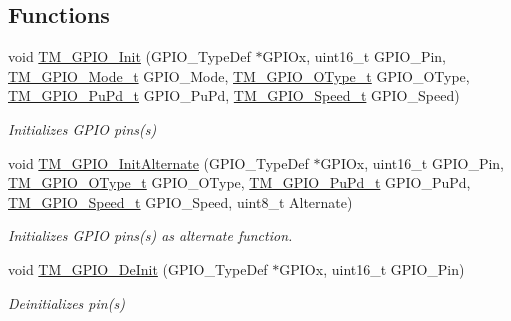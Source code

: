 \subsection*{Functions}
\begin{DoxyCompactItemize}
\item 
void \hyperlink{group___t_m___g_p_i_o___functions_ga7ea61719f45c8d46e56f636d7ffdf0d0}{T\+M\+\_\+\+G\+P\+I\+O\+\_\+\+Init} (G\+P\+I\+O\+\_\+\+Type\+Def $\ast$G\+P\+I\+Ox, uint16\+\_\+t G\+P\+I\+O\+\_\+\+Pin, \hyperlink{group___t_m___g_p_i_o___typedefs_gacbb363a57d0e70ea563e494eff1db3ca}{T\+M\+\_\+\+G\+P\+I\+O\+\_\+\+Mode\+\_\+t} G\+P\+I\+O\+\_\+\+Mode, \hyperlink{group___t_m___g_p_i_o___typedefs_ga1d443fe266a4073f40ea271ae7b8df9f}{T\+M\+\_\+\+G\+P\+I\+O\+\_\+\+O\+Type\+\_\+t} G\+P\+I\+O\+\_\+\+O\+Type, \hyperlink{group___t_m___g_p_i_o___typedefs_ga50ddb0da56d8a388dee368c55e968602}{T\+M\+\_\+\+G\+P\+I\+O\+\_\+\+Pu\+Pd\+\_\+t} G\+P\+I\+O\+\_\+\+Pu\+Pd, \hyperlink{group___t_m___g_p_i_o___typedefs_gaa57736d106efbe14067be22025f296c4}{T\+M\+\_\+\+G\+P\+I\+O\+\_\+\+Speed\+\_\+t} G\+P\+I\+O\+\_\+\+Speed)
\begin{DoxyCompactList}\small\item\em Initializes G\+P\+IO pins(s) \end{DoxyCompactList}\item 
void \hyperlink{group___t_m___g_p_i_o___functions_gac91349d1bf42b50463ebc2716130eb89}{T\+M\+\_\+\+G\+P\+I\+O\+\_\+\+Init\+Alternate} (G\+P\+I\+O\+\_\+\+Type\+Def $\ast$G\+P\+I\+Ox, uint16\+\_\+t G\+P\+I\+O\+\_\+\+Pin, \hyperlink{group___t_m___g_p_i_o___typedefs_ga1d443fe266a4073f40ea271ae7b8df9f}{T\+M\+\_\+\+G\+P\+I\+O\+\_\+\+O\+Type\+\_\+t} G\+P\+I\+O\+\_\+\+O\+Type, \hyperlink{group___t_m___g_p_i_o___typedefs_ga50ddb0da56d8a388dee368c55e968602}{T\+M\+\_\+\+G\+P\+I\+O\+\_\+\+Pu\+Pd\+\_\+t} G\+P\+I\+O\+\_\+\+Pu\+Pd, \hyperlink{group___t_m___g_p_i_o___typedefs_gaa57736d106efbe14067be22025f296c4}{T\+M\+\_\+\+G\+P\+I\+O\+\_\+\+Speed\+\_\+t} G\+P\+I\+O\+\_\+\+Speed, uint8\+\_\+t Alternate)
\begin{DoxyCompactList}\small\item\em Initializes G\+P\+IO pins(s) as alternate function. \end{DoxyCompactList}\item 
void \hyperlink{group___t_m___g_p_i_o___functions_gac87f1d18ac3e984bce0cbf44f7210198}{T\+M\+\_\+\+G\+P\+I\+O\+\_\+\+De\+Init} (G\+P\+I\+O\+\_\+\+Type\+Def $\ast$G\+P\+I\+Ox, uint16\+\_\+t G\+P\+I\+O\+\_\+\+Pin)
\begin{DoxyCompactList}\small\item\em Deinitializes pin(s) \end{DoxyCompactList}\item 

\end{DoxyCompactItemize}
